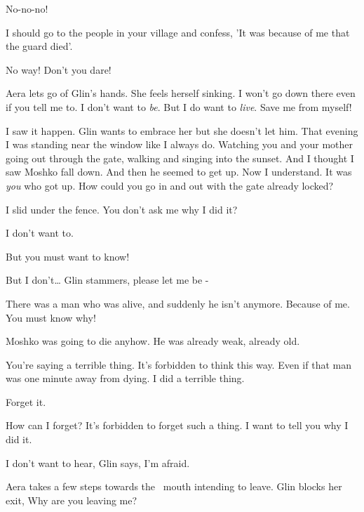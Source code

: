 \documentclass[letterpaper]{article}
\begin{document}
{\textquotedbl}No-no-no!{\textquotedbl}~ 

{\textquotedbl}I should go to the people in your village and confess, 'It was because of me that the guard
died'.{\textquotedbl} 

{\textquotedbl}No way! Don't you dare!{\textquotedbl} ~~~~~~~~~~~~~~~~~~~~~~~~~~~~~~~~~~~~~~~~~~~~ 

Aera lets go of Glin's hands. She feels herself sinking. {\textquotedbl}I won't go down there even if you tell me to. I
don't want to \textit{be}. But I do want to \textit{live}. Save me from myself!{\textquotedbl} 

{\textquotedbl}I saw it happen.{\textquotedbl} Glin wants to embrace her but she doesn't let him. {\textquotedbl}That
evening I was standing near the window like I always do. Watching you and your mother going out through the gate,
walking and singing into the sunset. And I thought I saw Moshko fall down. And then he seemed to get up. Now I
understand. It was \textit{you} who got up. How could you go in and out with the gate already locked?{\textquotedbl} 

{\textquotedbl}I slid under the fence. You don't ask me why I did it?{\textquotedbl} 

{\textquotedbl}I don't want to.{\textquotedbl} 

{\textquotedbl}But you must want to know!{\textquotedbl} 

{\textquotedbl}But I don't{\dots}{\textquotedbl} Glin stammers, {\textquotedbl}please let me be -{\textquotedbl} 

{\textquotedbl}There was a man who was alive, and suddenly he isn't anymore. Because of me. You must know
why!{\textquotedbl} 

{\textquotedbl}Moshko was going to die anyhow. He was already weak, already old.{\textquotedbl} 

{\textquotedbl}You're saying a terrible thing. It's forbidden to think this way. Even if that man was one minute away
from dying. I did a terrible thing.{\textquotedbl} 

{\textquotedbl}Forget it.{\textquotedbl} 

{\textquotedbl}How can I forget? It's forbidden to forget such a thing. I want to tell you why I did it.{\textquotedbl} 

{\textquotedbl}I don't want to hear,{\textquotedbl} Glin says, {\textquotedbl}I'm afraid.{\textquotedbl}

Aera takes a few steps towards the \ mouth\textcolor{red}{ }intending to leave. Glin blocks her exit, {\textquotedbl}Why
are you leaving me?{\textquotedbl} 
\end{document}
